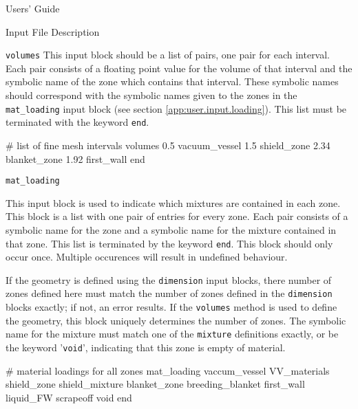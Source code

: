 \begin{chapter}{Users' Guide\label{app:user.guide}}
\begin{section}{Input File Description\label{app:user.input}}
\begin{subsection}{\texttt{volumes}\label{app:user.input.vol}}
      This input block should be a list of pairs, one pair for each
      interval.  Each pair consists of a floating point value for the
      volume of that interval and the symbolic name of the zone which
      contains that interval.  These symbolic names should correspond
      with the symbolic names given to the zones in the
      \texttt{mat\_loading} input block (see section
      \ref{app:user.input.loading}).  This list must be terminated with the
      keyword \texttt{end}.

      \begin{center}
        \renewcommand{\baselinestretch}{1}\normalsize
        \begin{boxedverbatim}
# list of fine mesh intervals
volumes
   0.5     vacuum_vessel
   1.5     shield_zone
   2.34    blanket_zone
   1.92    first_wall
end          
\end{boxedverbatim}
      \end{center}
    \end{subsection}

    \begin{subsection}{\texttt{mat\_loading}\label{app:user.input.loading}}
      
      This input block is used to indicate which mixtures are
      contained in each zone.  This block is a list with one pair of
      entries for every zone.  Each pair consists of a symbolic name
      for the zone and a symbolic name for the mixture contained in
      that zone.  This list is terminated by the keyword \texttt{end}.
      This block should only occur once.  Multiple occurences will
      result in undefined behaviour.

      If the geometry is defined using the \texttt{dimension} input
      blocks, there number of zones defined here must match the number
      of zones defined in the \texttt{dimension} blocks exactly; if
      not, an error results.  If the \texttt{volumes} method is used
      to define the geometry, this block uniquely determines the
      number of zones.  The symbolic name for the mixture must match
      one of the \texttt{mixture} definitions exactly, or be the
      keyword '\texttt{void}', indicating that this zone is empty of
      material.

      \begin{center}
        \renewcommand{\baselinestretch}{1}\normalsize
        \begin{boxedverbatim}
# material loadings for all zones
mat_loading
   vaccum_vessel  VV_materials
   shield_zone    shield_mixture
   blanket_zone   breeding_blanket
   first_wall     liquid_FW
   scrapeoff      void          
end
\end{boxedverbatim}
      \end{center}
      

\end{subsection}
\end{section}
\end{chapter}
